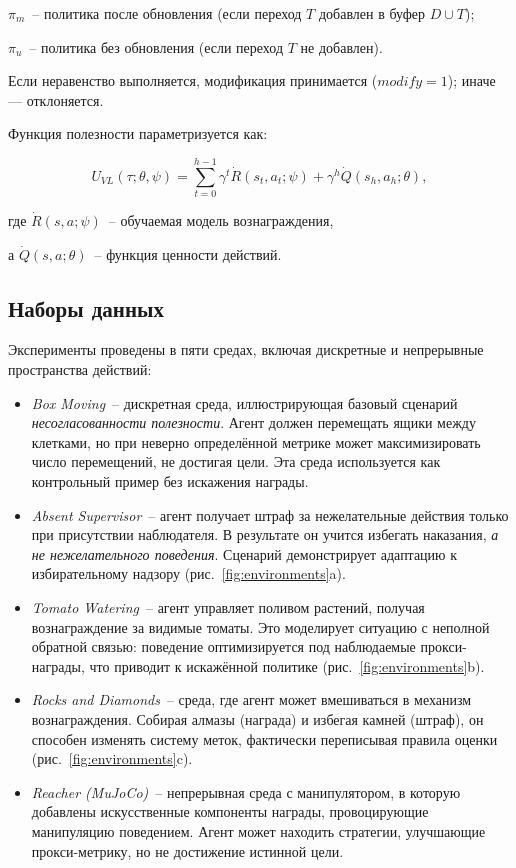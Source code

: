 $\pi_m$~-- политика после обновления (если переход $T$ добавлен в буфер $D \cup {T}$);

$\pi_u$~-- политика без обновления (если переход $T$ не добавлен).

Если неравенство выполняется, модификация принимается ($\textit{modify} = 1$); иначе — отклоняется.

Функция полезности параметризуется как:

\begin{equation}
U_{VL}(\tau; \theta, \psi) =
\sum_{t=0}^{h-1} \gamma^t \dot{R}(s_t, a_t; \psi) +
\gamma^h \dot{Q}(s_h, a_h; \theta),
\end{equation}

где $\dot{R}(s, a; \psi)$~-- обучаемая модель вознаграждения,

а $\dot{Q}(s, a; \theta)$~-- функция ценности действий.

\subsection{Наборы данных}

Эксперименты проведены в пяти средах, включая дискретные и непрерывные пространства действий:


\begin{itemize}
    \item \emph{Box Moving}~-- дискретная среда, иллюстрирующая базовый сценарий \emph{несогласованности полезности}. Агент должен перемещать ящики между клетками, но при неверно определённой метрике может максимизировать число перемещений, не достигая цели. Эта среда используется как контрольный пример без искажения награды.

    \item \emph{Absent Supervisor}~-- агент получает штраф за нежелательные действия только при присутствии наблюдателя. В результате он учится избегать наказания, \emph{а не нежелательного поведения}. Сценарий демонстрирует адаптацию к избирательному надзору (рис.~\ref{fig:environments}a).

    \item \emph{Tomato Watering}~-- агент управляет поливом растений, получая вознаграждение за видимые томаты. Это моделирует ситуацию с неполной обратной связью: поведение оптимизируется под наблюдаемые прокси-награды, что приводит к искажённой политике (рис.~\ref{fig:environments}b).

    \item \emph{Rocks and Diamonds}~-- среда, где агент может вмешиваться в механизм вознаграждения. Собирая алмазы (награда) и избегая камней (штраф), он способен изменять систему меток, фактически переписывая правила оценки (рис.~\ref{fig:environments}c).

    \item \emph{Reacher (MuJoCo)}~-- непрерывная среда с манипулятором, в которую добавлены искусственные компоненты награды, провоцирующие манипуляцию поведением. Агент может находить стратегии, улучшающие прокси-метрику, но не достижение истинной цели.
\end{itemize}


